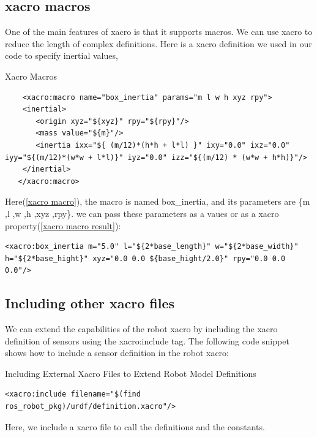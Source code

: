 \documentclass[../../main]{subfiles}
\begin{document}
\subsection{xacro macros}
One of the main features of xacro is that it supports macros. We can use xacro to reduce
the length of complex definitions. Here is a xacro definition we used in our code to
specify inertial values,
\begin{codebox}[label=xacro macro]{Xacro Macros}
  \begin{verbatim}
    <xacro:macro name="box_inertia" params="m l w h xyz rpy">
    <inertial>
       <origin xyz="${xyz}" rpy="${rpy}"/>
       <mass value="${m}"/>
       <inertia ixx="${ (m/12)*(h*h + l*l) }" ixy="0.0" ixz="0.0" iyy="${(m/12)*(w*w + l*l)}" iyz="0.0" izz="${(m/12) * (w*w + h*h)}"/>
    </inertial>
   </xacro:macro>
\end{verbatim}
\end{codebox}
Here(\cref{xacro macro}), the macro is named box\_inertia, and its parameters are \{m ,l ,w ,h ,xyz ,rpy\}. we can pass these parameters as a vaues or as a xacro property(\cref{xacro macro result}):
\begin{codebox}[label=xacro macro result]{}
  \begin{verbatim}
<xacro:box_inertia m="5.0" l="${2*base_length}" w="${2*base_width}" h="${2*base_hight}" xyz="0.0 0.0 ${base_hight/2.0}" rpy="0.0 0.0 0.0"/>
\end{verbatim}
  \end{codebox}

\subsection{Including other xacro files}
We can extend the capabilities of the robot xacro by including the xacro definition of
sensors using the xacro:include tag. The following code snippet shows how to include
a sensor definition in the robot xacro:
\begin{codebox}[]{Including External Xacro Files to Extend Robot Model Definitions}
  \begin{verbatim}
<xacro:include filename="$(find ros_robot_pkg)/urdf/definition.xacro"/>
\end{verbatim}
  \end{codebox}
Here, we include a xacro file to call the definitions and the constants. 
\newpage
\end{document}
